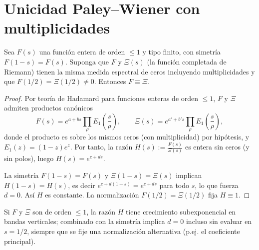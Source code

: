 \section{Unicidad Paley--Wiener con multiplicidades}\label{sec:paley-wiener}

\begin{theorem}
Sea $F(s)$ una función entera de orden $\le 1$ y tipo finito, con simetría $F(1-s)=F(s)$.
Suponga que $F$ y $\Xi(s)$ (la función completada de Riemann) tienen la misma medida
espectral de ceros incluyendo multiplicidades y que $F(1/2)=\Xi(1/2)\neq 0$.
Entonces $F\equiv \Xi$.
\end{theorem}

\begin{proof}
Por teoría de Hadamard para funciones enteras de orden $\le 1$, $F$ y $\Xi$
admiten productos canónicos
\[
F(s)=e^{a+bs}\prod_\rho E_1\!\left(\frac{s}{\rho}\right),\qquad
\Xi(s)=e^{a'+b's}\prod_\rho E_1\!\left(\frac{s}{\rho}\right),
\]
donde el producto es sobre los mismos ceros (con multiplicidad) por hipótesis,
y $E_1(z)=(1-z)e^{z}$.
Por tanto, la razón $H(s):=\frac{F(s)}{\Xi(s)}$ es entera sin ceros (y sin polos), luego $H(s)=e^{c+ds}$.

La simetría $F(1-s)=F(s)$ y $\Xi(1-s)=\Xi(s)$ implican
$H(1-s)=H(s)$, es decir $e^{c+d(1-s)}=e^{c+ds}$ para todo $s$, lo que fuerza $d=0$.
Así $H$ es constante. La normalización $F(1/2)=\Xi(1/2)$ fija $H\equiv 1$.
\end{proof}

\begin{lemma}
Si $F$ y $\Xi$ son de orden $\le 1$, la razón $H$ tiene crecimiento subexponencial en bandas verticales; combinado con la simetría implica $d=0$ incluso sin evaluar en $s=1/2$, siempre que se fije una normalización alternativa (p.ej. el coeficiente principal).
\end{lemma}

